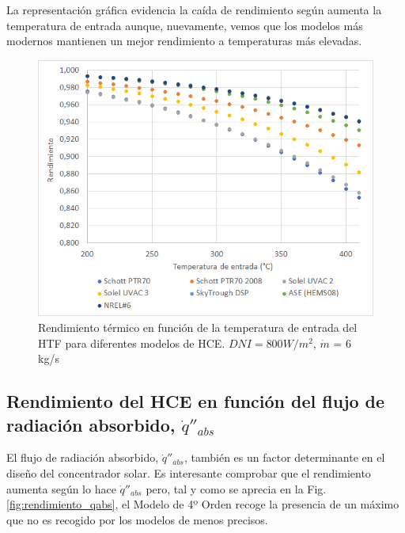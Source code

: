 La representación gráfica evidencia la caída de rendimiento según aumenta la temperatura de entrada aunque, nuevamente, vemos que los modelos más modernos mantienen un mejor rendimiento a temperaturas más elevadas.

\begin{figure}[H]
\includegraphics[width=0.9\linewidth]{images/rendimiento_temperatura.png}
\caption[Rendimiento térmico en función de la temperatura de entrada del HTF para diferentes modelos de HCE]{Rendimiento térmico en función de la temperatura de entrada del HTF para diferentes modelos de HCE. $DNI= 800 W/m^2$, $\dot m$ = 6 kg/s} 
\label{fig:test2a}
\end{figure}


\subsection{Rendimiento del HCE en función del flujo de radiación absorbido, $\dot q''_{abs}$}

El flujo de radiación absorbido, $\dot q''_{abs}$,  también es un factor determinante en el diseño del concentrador solar. Es interesante comprobar que el rendimiento aumenta según lo hace $\dot q''_{abs}$ pero, tal y como se aprecia en la Fig. \ref{fig:rendimiento_qabs}, el Modelo de 4º Orden recoge la presencia de un máximo que no es recogido por los modelos de menos precisos.  

